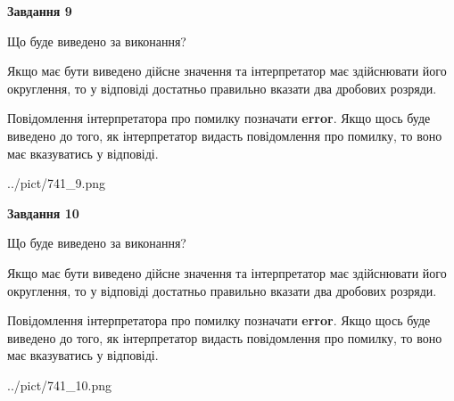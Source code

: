 \documentclass[12pt, ukrainian]{article}
\begin{document}
{\begin {Large}
{\begin {center}\textbf{Завдання 9}\end {center}}\par
Що буде виведено за виконання? \par

Якщо має бути виведено дійсне значення та інтерпретатор має здійснювати його округлення, 
то у відповіді достатньо правильно вказати два дробових розряди.

Повідомлення інтерпретатора про помилку позначати \textbf{error}.
Якщо щось буде виведено до того, як інтерпретатор видасть повідомлення про помилку, 
то воно має вказуватись у відповіді. \par

\begin{center}
	{../pict/741_9.png}
\end{center}
\newpage

{\begin {center}\textbf{Завдання 10}\end {center}}\par
Що буде виведено за виконання? \par

Якщо має бути виведено дійсне значення та інтерпретатор має здійснювати його округлення, 
то у відповіді достатньо правильно вказати два дробових розряди.

Повідомлення інтерпретатора про помилку позначати \textbf{error}.
Якщо щось буде виведено до того, як інтерпретатор видасть повідомлення про помилку, 
то воно має вказуватись у відповіді. \par

\begin{center}
	{../pict/741_10.png}
\end{center}
\newpage

\end {Large}}
\end{document}
